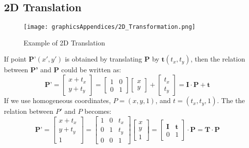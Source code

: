 \subsection{2D Translation}
\begin{figure}[h!]
\centering
\texttt{[image: graphicsAppendices/2D\_Transformation.png]}
\caption{Example of 2D Translation}
\label{fig:2DTranslation}
\end{figure}
If point $\textbf{P'}(x', y')$ is obtained by translating \textbf{P} by $\textbf{t}(t_x, t_y)$, then the relation between \textbf{P'} and \textbf{P} could be written as:\\
$$\textbf{P'} = \left[\begin{array}{c} x+t_x \\ y+t_y \end{array}\right] = \left[\begin{array}{ccc} 1 & 0\\ 
0 & 1 \end{array}\right]\left[\begin{array}{c} x \\ y \end{array}\right] +  \left[\begin{array}{r}t_x \\ t_y\end{array}\right] = \textbf{I} \cdot \textbf{P} + \textbf{t}$$  
If we use homogeneous coordinates, $P = (x, y, 1)$, and $t=(t_x, t_y, 1)$. The the relation between $P'$ and $P$ becomes:
$$\textbf{P'} = \left[\begin{array}{r}x+t_x \\ y + t_y \\ 1 \end{array}\right] =  \left[\begin{array}{rrr} 1 & 0 & t_x\\ 0 & 1 & t_y\\ 0 & 0 & 1 \end{array}\right] \left[\begin{array}{r}x\\ y\\ 1 \end{array}\right] =  \left[\begin{array}{rr}\textbf{I} & \textbf{t} \\ 0 & 1 \end{array}\right]\cdot \textbf{P} = \textbf{T} \cdot \textbf{P}$$

